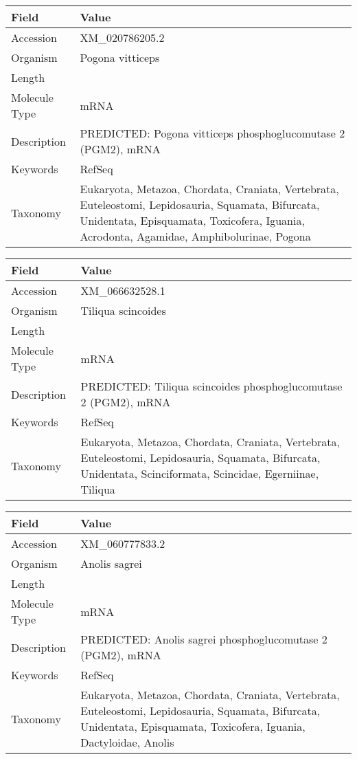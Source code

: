 \documentclass[10pt]{article}
\begin{document}
\vspace{1em}
{\footnotesize
\begin{longtable}{>{\raggedright\arraybackslash}p{4.5cm} >{\raggedright\arraybackslash}p{11.5cm}}
\textbf{Field} & \textbf{Value} \\
\hline
Accession & XM\_020786205.2 \\
Organism & Pogona vitticeps \\
Length & 3252 \\
Molecule Type & mRNA \\
Description & PREDICTED: Pogona vitticeps phosphoglucomutase 2 (PGM2), mRNA \\
Keywords & RefSeq \\
Taxonomy & Eukaryota, Metazoa, Chordata, Craniata, Vertebrata, Euteleostomi, Lepidosauria, Squamata, Bifurcata, Unidentata, Episquamata, Toxicofera, Iguania, Acrodonta, Agamidae, Amphibolurinae, Pogona \\
\end{longtable}
}

\vspace{1em}
{\footnotesize
\begin{longtable}{>{\raggedright\arraybackslash}p{4.5cm} >{\raggedright\arraybackslash}p{11.5cm}}
\textbf{Field} & \textbf{Value} \\
\hline
Accession & XM\_066632528.1 \\
Organism & Tiliqua scincoides \\
Length & 4798 \\
Molecule Type & mRNA \\
Description & PREDICTED: Tiliqua scincoides phosphoglucomutase 2 (PGM2), mRNA \\
Keywords & RefSeq \\
Taxonomy & Eukaryota, Metazoa, Chordata, Craniata, Vertebrata, Euteleostomi, Lepidosauria, Squamata, Bifurcata, Unidentata, Scinciformata, Scincidae, Egerniinae, Tiliqua \\
\end{longtable}
}

\vspace{1em}
{\footnotesize
\begin{longtable}{>{\raggedright\arraybackslash}p{4.5cm} >{\raggedright\arraybackslash}p{11.5cm}}
\textbf{Field} & \textbf{Value} \\
\hline
Accession & XM\_060777833.2 \\
Organism & Anolis sagrei \\
Length & 3100 \\
Molecule Type & mRNA \\
Description & PREDICTED: Anolis sagrei phosphoglucomutase 2 (PGM2), mRNA \\
Keywords & RefSeq \\
Taxonomy & Eukaryota, Metazoa, Chordata, Craniata, Vertebrata, Euteleostomi, Lepidosauria, Squamata, Bifurcata, Unidentata, Episquamata, Toxicofera, Iguania, Dactyloidae, Anolis \\
\end{longtable}
}
\end{document}
